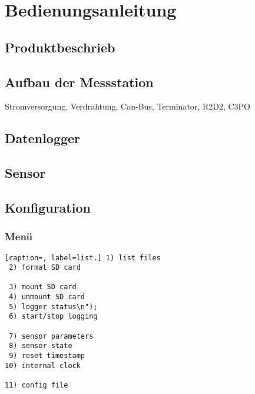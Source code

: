 %
%

\chapter{Bedienungsanleitung}\label{chap.bedienung}

\section{Produktbeschrieb}


\section{Aufbau der Messstation}
Stromversorgung, Verdrahtung, Can-Bus, Terminator, R2D2, C3PO

\section{Datenlogger}


\section{Sensor}


\section{Konfiguration}


\subsection{Menü}
\begin{lstlisting}[caption=, label=list.] 1) list files
 2) format SD card

 3) mount SD card
 4) unmount SD card
 5) logger status\n");
 6) start/stop logging

 7) sensor parameters
 8) sensor state
 9) reset timestamp
10) internal clock

11) config file
\end{lstlisting}


